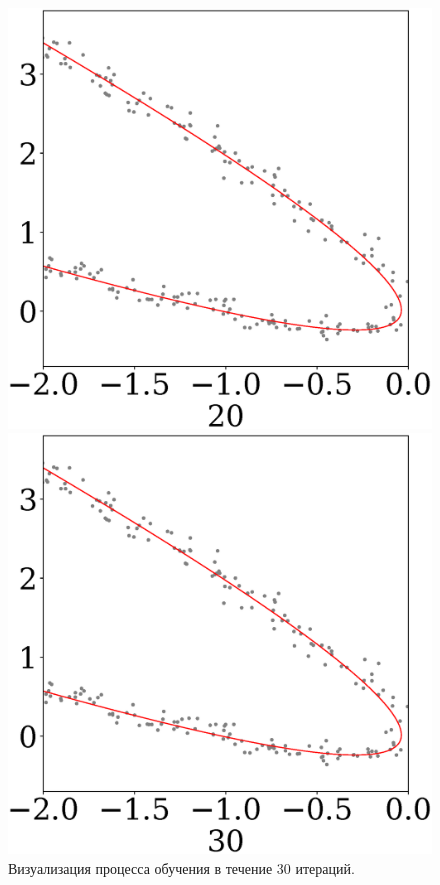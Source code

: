 \documentclass[12pt, twoside]{article}
\numberwithin{equation}{section}
\begin{document}
\begin{figure}
\begin{minipage}{.25\textwidth}
      \includegraphics[scale = 0.19]{figures/511_20}
\end{minipage}
\begin{minipage}{.20\textwidth}

      \includegraphics[scale = 0.19]{figures/511_30}
\end{minipage}
\caption{Визуализация процесса обучения в течение 30 итераций.}
\label{ce:fig1}
\end{figure}
\end{document}
